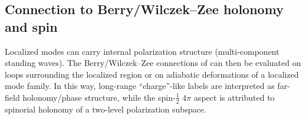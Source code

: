 \subsection{Connection to Berry/Wilczek--Zee holonomy and spin}

Localized modes can carry internal polarization structure (multi-component standing waves).
The Berry/Wilczek--Zee connections of  can then be evaluated on loops surrounding the localized region
or on adiabatic deformations of a localized mode family.
In this way, long-range ``charge''-like labels are interpreted as far-field holonomy/phase structure, while the
spin-$\tfrac12$ $4\pi$ aspect is attributed to spinorial holonomy of a two-level polarization subspace.
